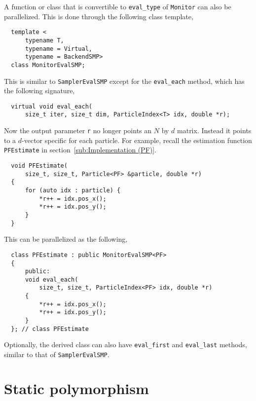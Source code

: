 A function or class that is convertible to \verb|eval_type| of \verb|Monitor|
can also be parallelized. This is done through the following class template,
\begin{Verbatim}
  template <
      typename T,
      typename = Virtual,
      typename = BackendSMP>
  class MonitorEvalSMP;
\end{Verbatim}
This is similar to \verb|SamplerEvalSMP| except for the \verb|eval_each|
method, which has the following signature,
\begin{Verbatim}
  virtual void eval_each(
      size_t iter, size_t dim, ParticleIndex<T> idx, double *r);
\end{Verbatim}
Now the output parameter \verb|r| no longer points an $N$ by $d$ matrix.
Instead it points to a $d$-vector specific for each particle. For example,
recall the estimation function \verb|PFEstimate| in
section~\ref{sub:Implementation (PF)}.
\begin{Verbatim}
  void PFEstimate(
      size_t, size_t, Particle<PF> &particle, double *r)
  {
      for (auto idx : particle) {
          *r++ = idx.pos_x();
          *r++ = idx.pos_y();
      }
  }
\end{Verbatim}
This can be parallelized as the following,
\begin{Verbatim}
  class PFEstimate : public MonitorEvalSMP<PF>
  {
      public:
      void eval_each(
          size_t, size_t, ParticleIndex<PF> idx, double *r)
      {
          *r++ = idx.pos_x();
          *r++ = idx.pos_y();
      }
  }; // class PFEstimate
\end{Verbatim}
Optionally, the derived class can also have \verb|eval_first| and
\verb|eval_last| methods, similar to that of \verb|SamplerEvalSMP|.

\section{Static polymorphism}
\label{sec:Static polymorphism}

